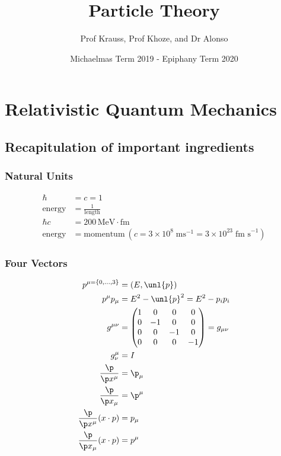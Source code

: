 \documentclass[a4paper, 11pt, normalem]{report}
\title{Particle Theory \vspace{-20pt}}
\author{Prof Krauss, Prof Khoze, and Dr Alonso}
\date{\vspace{-15pt}Michaelmas Term 2019 - Epiphany Term 2020}
\begin{document}
\maketitle
\tableofcontents

\part{Relativistic Quantum Mechanics}
\chapter{Recapitulation of important ingredients}

\section{Natural Units}
\begin{align}
    \hbar &= c = 1 \\
    \text{energy} &= \frac{1}{\text{length}} \\
    \hbar c &= 200\,\text{MeV}\cdot\text{fm} \\
    \text{energy} &= \text{momentum}~ (c = 3\times10^8\;\text{ms}^{-1} = 3\times10^{23}\;\text{fm s}^{-1})
\end{align}

\section{Four Vectors}
\begin{align}
    p^{\mu=\{0,\dots,3\}} &= (E,\unl{p}) \\
    p^\mu p_\mu &= E^2 - \unl{p}^2 = E^2 - p_ip_i \\
    g^{\mu\nu} &= \begin{pmatrix} 1 & 0 & 0 & 0 \\ 0 & -1 & 0 & 0 \\ 0 & 0 & -1 & 0 \\ 0 & 0 & 0 & -1 \end{pmatrix} = g_{\mu\nu} \\
    g^\mu_\nu &= I \\
    \frac{\p}{\p x^\mu} &= \p_\mu \\
    \frac{\p}{\p x_\mu} &= \p^\mu \\
    \frac{\p}{\p x^\mu} (x\cdot p) &= p_\mu \\
    \frac{\p}{\p x_\mu} (x\cdot p) &= p^\mu
\end{align}
\end{document}
